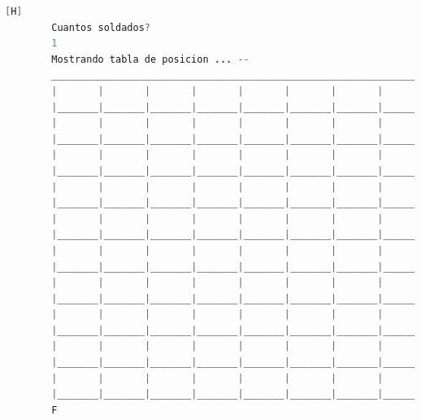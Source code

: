 \documentclass{article}
\begin{document}
	\begin{lstlisting}[language=java,caption={Las lineas de codigos del metodo creado: \textcolor{red}{VER EL TEXTO EN LATEX EN LA IMAGEN SE DEFORMA O EJECUTARLO}}][H]
		Cuantos soldados? 
		1
		Mostrando tabla de posicion ... --
		_________________________________________________________________________________
		|       |       |       |       |       |       |       |       |       |       |
		|_______|_______|_______|_______|_______|_______|_______|_______|_______|_______|
		|       |       |       |       |       |       |       |       |       |       |
		|_______|_______|_______|_______|_______|_______|_______|_______|_______|_______|
		|       |       |       |       |       |       |       |       |       |       |
		|_______|_______|_______|_______|_______|_______|_______|_______|_______|_______|
		|       |       |       |       |       |       |       |       |       |       |
		|_______|_______|_______|_______|_______|_______|_______|_______|_______|_______|
		|       |       |       |       |       |       |       |       |       |       |
		|_______|_______|_______|_______|_______|_______|_______|_______|_______|_______|
		|       |       |       |       |       |       |       |       |       |       |
		|_______|_______|_______|_______|_______|_______|_______|_______|_______|_______|
		|       |       |       |       |       |       |       |       |       |       |
		|_______|_______|_______|_______|_______|_______|_______|_______|_______|_______|
		|       |       |       |       |       |       |       |       |       |       |
		|_______|_______|_______|_______|_______|_______|_______|_______|_______|_______|
		|       |       |       |       |       |       |       |       |       |       |
		|_______|_______|_______|_______|_______|_______|_______|_______|_______|_______|
		|       |       |       |       |       |       |       |       |       |       |
		|_______|_______|_______|_______|_______|_______|_______|_______|_______|_______|
		F
	\end{lstlisting}
\end{document}

